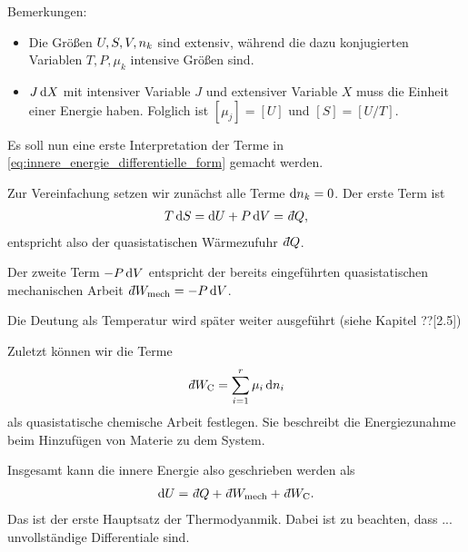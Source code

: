 Bemerkungen:
\begin{itemize}
    \item Die Größen $U, S,V,n_k$ sind extensiv, während die dazu konjugierten Variablen $T,P,\mu_k$ intensive Größen sind. 
    \item $J\mathop{}\!\mathrm{d} X$ mit intensiver Variable $J$ und extensiver Variable $X$ muss die Einheit einer Energie haben. Folglich ist $[\mu_j] = [U]$ und $[S]=[U/T]$. 
\end{itemize}

Es soll nun eine erste Interpretation der Terme in \eqref{eq:innere_energie_differentielle_form} gemacht werden. 

Zur Vereinfachung setzen wir zunächst alle Terme $\mathop{}\!\mathrm{d} n_k=0$. 
Der erste Term ist 
\begin{align*}
    T\diff S = \diff U+ P\diff V = \udiff Q,
\end{align*}
entspricht also der quasistatischen Wärmezufuhr $\udiff Q$. 

Der zweite Term $-P\mathop{}\!\mathrm{d} V$ entspricht der bereits eingeführten quasistatischen mechanischen Arbeit $\udiff W_\mathrm{mech}=-P\diff V$.


Die Deutung als Temperatur wird später weiter ausgeführt (siehe Kapitel ??[2.5])

Zuletzt können wir die Terme 
\begin{align*}
    \udiff W_ \mathrm{C} = \sum_{i = 1}^r \mu_i\diff \sm_i
\end{align*}
als quasistatische chemische Arbeit festlegen. Sie beschreibt die Energiezunahme beim Hinzufügen von Materie zu dem System. 

Insgesamt kann die innere Energie also geschrieben werden als
\begin{align}
    \label{eq:erster_HS_TD}
    \diff U = \udiff Q + \udiff W_\mathrm{mech} + \udiff W_\mathrm{C}.
\end{align}
Das ist der erste Hauptsatz der Thermodyanmik. 
Dabei ist zu beachten, dass ... unvollständige Differentiale sind. 

